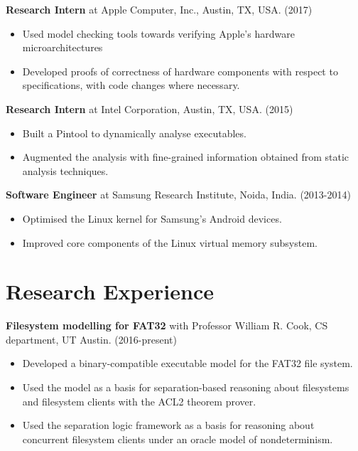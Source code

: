 \documentclass[margin]{res}
\begin{document}
\begin{resume}
 {\bf Research Intern} at Apple Computer, Inc., Austin, TX, USA. \hfill (2017)
 \begin{itemize} \itemsep -2pt  %
 \item Used model checking tools towards verifying Apple's hardware microarchitectures
 \item Developed proofs of correctness of hardware components with
   respect to specifications, with code changes where necessary.
 \end{itemize}

 {\bf Research Intern} at Intel Corporation, Austin, TX, USA. \hfill (2015)
 \begin{itemize} \itemsep -2pt  %
 \item Built a Pintool to dynamically analyse executables.
 \item Augmented
   the analysis with fine-grained information obtained from static
   analysis techniques.
 \end{itemize}

 {\bf Software Engineer} at Samsung Research Institute, Noida, India. \hfill (2013-2014)
 \begin{itemize} \itemsep -2pt  %
 \item Optimised the Linux kernel for Samsung's
   Android devices.
 \item Improved core components of the Linux virtual memory subsystem.
 \end{itemize}

\section{Research Experience}

 {\bf Filesystem modelling for FAT32} with Professor William R. Cook, CS department, UT Austin. \hfill (2016-present)
 \begin{itemize} \itemsep -2pt  %
 \item Developed a binary-compatible executable model for the FAT32 file system.
 \item Used the model as a basis for separation-based reasoning about
   filesystems and filesystem clients with the ACL2 theorem prover.
 \item Used the separation logic framework as a basis for reasoning
   about concurrent filesystem clients under an oracle model of
   nondeterminism.
 \end{itemize}


\end{resume}
\end{document}
